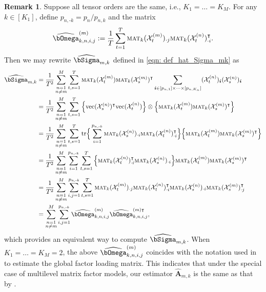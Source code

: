 \documentclass[aos]{imsart}
\theoremstyle{plain}
\theoremstyle{definition}
\newtheorem{remark}{Remark}
\def\mat{\textnormal{\textsc{mat}}}
\def\tr{\textnormal{\text{tr}}}
\def\wh#1{\widehat{#1}}
\def\cX{\mathcal{X}}
\def\bi{\boldsymbol{i}}
\def\bA{\mathbf{A}}
\def\trans{\intercal}
\def\vec{\mathrm{vec}}
\begin{document}
\begin{remark}
\label{remark: hat_Sigma_rewrite}
Suppose all tensor orders are the same, i.e., $K_1=\dots=K_M$. For any $k\in[K_1]$, define $p_{n,\text{-}k} =p_n/p_{n,k}$ and the matrix
\[
\wh\bOmega_{k,n,i,j}^{(m)} := \frac{1}{T} \sum_{t=1}^T \mat_k(\cX_t^{(m)})_{\cdot j} \mat_k(\cX_t^{(n)})_{\cdot i}^\trans .
\]
Then we may rewrite $\wh\bSigma_{m,k}$ defined in \eqref{eqn: def_hat_Sigma_mk} as
\begin{align*}
    \wh\bSigma_{m,k} &= \frac{1}{T^2} \sum_{\substack{n=1\\ n\neq m}}^M \sum_{t,s=1}^T \mat_k(\cX_t^{(m)}) \mat_k(\cX_s^{(m)})^\trans \sum_{\bi \in [p_{n,1}] \times \cdots \times[p_{n,K_n}]} (\cX_t^{(n)})_{\bi} (\cX_s^{(n)})_{\bi} \\
    &=
    \frac{1}{T^2} \sum_{\substack{n=1\\ n\neq m}}^M \sum_{t,s=1}^T \Big\{ \vec(\cX_s^{(n)})^\trans \vec(\cX_t^{(n)}) \Big\} \otimes \Big\{ \mat_k(\cX_t^{(m)}) \mat_k(\cX_s^{(m)})^\trans \Big\} \\
    &=
    \frac{1}{T^2} \sum_{\substack{n=1\\ n\neq m}}^M \sum_{t,s=1}^T \tr\Big\{ \sum_{i=1}^{p_{n,\text{-}k}} \mat_k(\cX_s^{(n)})_{\cdot i} \mat_k(\cX_t^{(n)})_{\cdot i}^\trans \Big\} \Big\{ \mat_k(\cX_t^{(m)}) \mat_k(\cX_s^{(m)})^\trans \Big\} \\
    &=
    \frac{1}{T^2} \sum_{\substack{n=1\\ n\neq m}}^M \sum_{i=1}^{p_{n,\text{-}k}} \sum_{t,s=1}^T \Big\{ \mat_k(\cX_t^{(n)})_{\cdot i}^\trans  \mat_k(\cX_s^{(n)})_{\cdot i} \Big\} \mat_k(\cX_t^{(m)}) \mat_k(\cX_s^{(m)})^\trans \\
    &=
    \frac{1}{T^2} \sum_{\substack{n=1\\ n\neq m}}^M \sum_{i,j=1}^{p_{n,\text{-}k}} \sum_{t,s=1}^T \mat_k(\cX_t^{(m)})_{\cdot j} \mat_k(\cX_t^{(n)})_{\cdot i}^\trans \mat_k(\cX_s^{(n)})_{\cdot i} \mat_k(\cX_s^{(m)})_{\cdot j}^\trans \\
    &=
    \sum_{\substack{n=1\\ n\neq m}}^M \sum_{i,j=1}^{p_{n,\text{-}k}} \wh\bOmega_{k,n,i,j}^{(m)} \wh\bOmega_{k,n,i,j}^{(m) \trans} ,
\end{align*}
which provides an equivalent way to compute $\wh\bSigma_{m,k}$. When $K_1=\dots=K_M=2$, the above $\wh\bOmega_{k,n,i,j}^{(m)}$ coincides with the notation used in \cite{Zhangetal2025} to estimate the global factor loading matrix. This indicates that under the special case of multilevel matrix factor models, our estimator $\wh\bA_{m,k}$ is the same as that by \cite{Zhangetal2025}.
\end{remark}
\end{document}
